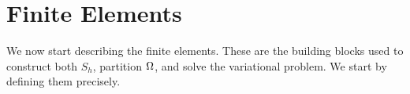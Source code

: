 \section{Finite Elements}
We now start describing the finite elements. These are the building blocks 
used to construct both $S_h$, partition $\Omega$, and solve the variational problem.
We start by defining them precisely.



 